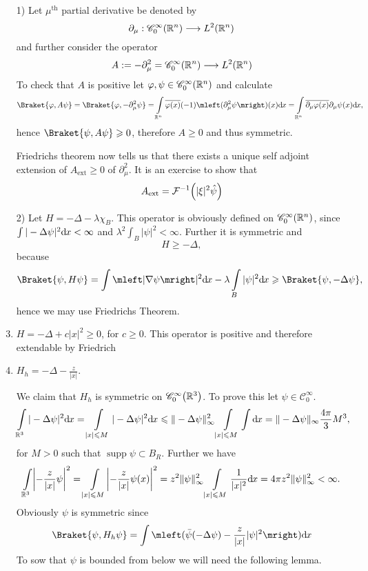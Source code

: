 \documentclass[12pt]{article}
\numberwithin{equation}{section}
\theoremstyle{plain}
\theoremstyle{plain}
\renewcommand{\d}{\mathrm{d}\hspace{-0.025cm}}
\renewcommand{\phi}{\varphi}
\DeclareMathOperator*{\supp}{supp}
\begin{document}
\begin{example*}
\begin{enumerate}

	\item[1)] Let $\mu^{\text{th}}$ partial derivative be denoted by 
	\[
		\partial_{\mu}: \mathscr C^{\infty}_0 \mleft( \mathbb{R}^n \mright) \longrightarrow L^2 \mleft( \mathbb{R}^n \mright)	
	\]
	and further consider the operator 
	\[
		A:= - \partial_\mu^2 = \mathscr C_0^{\infty} \mleft( \mathbb{R}^n \mright) \longrightarrow L^2 \mleft( \mathbb{R}^n \mright)
	\]
	To check that $A$ is positive let $\phi,\psi \in \mathscr C_0^{\infty} \mleft( \mathbb{R}^n \mright)$ and calculate
	\[
		\Braket{\phi, A \psi} = \Braket{\phi, - \partial_\mu^2 \psi} = \int\limits_{\mathbb{R}^n} \overline{\phi(x)} (-1) \mleft( \partial_\mu^2 \psi \mright) (x) \d x = \int\limits_{\mathbb{R}^n} \overline{\partial_\mu \phi(x)} \partial_\mu \psi(x)	 \d x,
	\]
	hence $\Braket{\psi, A \psi} \geqslant 0$, therefore $A \geqslant 0$ and thus symmetric.
	
	Friedrichs theorem now tells us that there exists a unique self adjoint extension of $A_{\text{ext}} \geqslant 0$ of $\partial_\mu^2$. It is an exercise to show that 
	\[
		A_{\text{ext}} =\mathcal F^{-1}\mleft( |\xi|^2\hat\psi \mright)
	\] 
	
	\item[2)] Let $H = - \Delta - \lambda \chi_B$. This operator is obviously defined on $\mathscr C^{\infty}_0\mleft( \mathbb{R}^n \mright)$, since \\ $\int |-\Delta \psi|^2 \d x < \infty$ and $\lambda^2 \int_B |\psi|^2 < \infty$. Further it is symmetric and 
	\[
		H \geqslant - \Delta,	
	\]
	because 
	\[
		\Braket{\psi, H \psi} = \int \mleft|\nabla \psi \mright|^2 \d x - \lambda \int\limits_B |\psi|^2 \d x	\geqslant \Braket{\psi, - \Delta \psi},
	\]
	hence we may use Friedrichs Theorem.
	\item $H = - \Delta + c |x|^2\geqslant 0$, for $c \geqslant 0$. This operator is positive and therefore extendable by Friedrich
	\item $H_h = -\Delta - \frac{z}{|x|}$. 
	
	We claim that $H_h$ is symmetric on $\mathscr C^{\infty}_0 \mleft( \mathbb{R}^3 \mright)$. To prove this let $\psi \in \mathscr C_0^{\infty}$.
	\[
		\int\limits_{\mathbb{R}^3} |-\Delta \psi|^2 \d x = \int\limits_{|x| \leqslant M} |-\Delta \psi|^2 \d x \leqslant \|-\Delta \psi \|^2_{\infty} \int\limits_{|x|\leqslant M} \int \d x = 	\|-\Delta \psi \|_{\infty}  \frac{4\pi}{3} M^3,
	\]
	for $M > 0$ such that $\supp \psi \subset B_R$. Further we have 
	\[
		\int\limits_{\mathbb{R}^3}\mleft| - \frac{z}{|x|} \psi \mright|^2 = \int\limits_{|x|\leqslant M} \mleft| - \frac{z}{|x|} \psi(x) \mright|^2 = z^2 \|\psi\|_{\infty}^2 \int\limits_{|x| \leqslant M} \frac{1}{|x|^2} \d x = 4 \pi  z^2 \|\psi\|_{\infty}^2 < \infty.
	\]
	Obviously $\psi$ is symmetric since 
	\[
		\Braket{\psi, H_h \psi} = \int \mleft( \bar \psi (-\Delta \psi) - \frac{z}{|x|}|\psi|^2 \mright) \d x	
	\]
	To sow that $\psi$ is bounded from below we will need the following lemma.	
	

\end{enumerate}
\end{example*}
\end{document}
